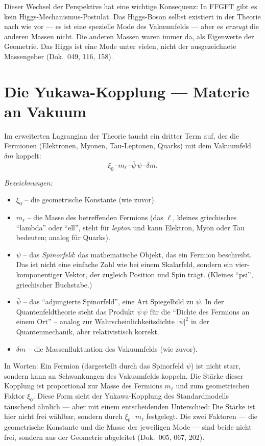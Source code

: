 Dieser Wechsel der Perspektive hat eine wichtige Konsequenz: In
FFGFT gibt es kein Higgs-Mechanismus-Postulat. Das Higgs-Boson selbst
existiert in der Theorie nach wie vor --- es ist eine spezielle Mode
des Vakuumfelds --- aber es \emph{erzeugt} die anderen Massen nicht.
Die anderen Massen waren immer da, als Eigenwerte der Geometrie. Das
Higgs ist eine Mode unter vielen, nicht der ausgezeichnete
Massengeber (Dok.~049, 116, 158).

\section{Die Yukawa-Kopplung --- Materie an Vakuum}

Im erweiterten Lagrangian der Theorie taucht ein dritter Term auf,
der die Fermionen (Elektronen, Myonen, Tau-Leptonen, Quarks) mit dem
Vakuumfeld $\delta m$ koppelt:
\[
  \xi_0 \cdot m_\ell \cdot \bar\psi\,\psi \cdot \delta m.
\]

\noindent\textit{Bezeichnungen:}
\begin{itemize}\setlength\itemsep{0pt}
  \item $\xi_0$ -- die geometrische Konstante (wie zuvor).
  \item $m_\ell$ -- die Masse des betreffenden Fermions (das
        $\ell$, kleines griechisches \enquote{lambda} oder \enquote{ell},
        steht für \emph{lepton} und kann Elektron, Myon oder Tau bedeuten;
        analog für Quarks).
  \item $\psi$ -- das \emph{Spinorfeld}: das mathematische Objekt, das
        ein Fermion beschreibt. Das ist nicht eine einfache Zahl wie
        bei einem Skalarfeld, sondern ein vier-komponentiger Vektor,
        der zugleich Position und Spin trägt. (Kleines \enquote{psi},
        griechischer Buchstabe.)
  \item $\bar\psi$ -- das \enquote{adjungierte Spinorfeld}, eine Art
        Spiegelbild zu $\psi$. In der Quantenfeldtheorie steht das
        Produkt $\bar\psi\,\psi$ für die \enquote{Dichte des Fermions
        an einem Ort} -- analog zur Wahrscheinlichkeitsdichte
        $|\psi|^2$ in der Quantenmechanik, aber relativistisch korrekt.
  \item $\delta m$ -- die Massenfluktuation des Vakuumfelds (wie zuvor).
\end{itemize}

\medskip\noindent
In Worten: Ein Fermion (dargestellt durch das Spinorfeld $\psi$) ist
nicht starr, sondern kann an Schwankungen des Vakuumfelds koppeln.
Die Stärke dieser Kopplung ist proportional zur Masse des Fermions
$m_\ell$ und zum geometrischen Faktor $\xi_0$. Diese Form sieht der
Yukawa-Kopplung des Standardmodells täuschend ähnlich --- aber mit
einem entscheidenden Unterschied: Die Stärke ist hier nicht frei
wählbar, sondern durch $\xi_0 \cdot m_\ell$ festgelegt. Die zwei
Faktoren --- die geometrische Konstante und die Masse der jeweiligen
Mode --- sind beide nicht frei, sondern aus der Geometrie abgeleitet
(Dok.~005, 067, 202).

